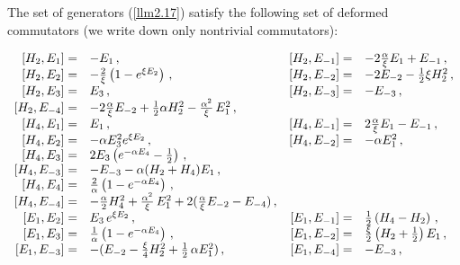 \documentclass[a4paper,12pt,showkeys]{article}
\begin{document}
 The set of generators (\ref{llm2.17}) satisfy the following set of
 deformed commutators (we write down only nontrivial commutators):

\begin{eqnarray*}
\label{lulymo1}
\begin{array}{rlrl}
    [ H_2 , E_1 ] = & - E_1 \, ,
&
[ H_2 , E_{-1} ]  =& - 2\frac{\alpha}{\xi} E_1 + E_{-1}\, ,
\cr
 [ H_2 , E_2 ] =&- \frac{2}{\xi}\left(1- e^{\xi E_2} \right) \, ,
& [ H_2 , E_{-2} ] =&  - 2E_{-2}- \frac{1}{2} \xi H_{2}^2 \, ,
\cr [ H_2 , E_3 ] =& E_3 \, ,
&[ H_2 , E_{-3} ] =& -  E_{-3} \, ,
\cr [ H_2 , E_{-4} ] =&
    - 2\frac{\alpha}{\xi} E_{-2}  + \frac{1}{2}\alpha H^2_2
    - \frac{\alpha^2}{\xi}\, E_1^2 \, , &
\cr [ H_4 , E_1 ] =& E_1 \, , & [ H_4 , E_{-1} ] = &
2\frac{\alpha}{\xi} E_1 - E_{-1} \,, \cr [ H_4 , E_2 ] =&- \alpha
E_3^2 e^{\xi E_2} \, ,
 &[ H_4 , E_{-2} ]=& -\alpha E_1^2 \, ,
\cr
 [ H_4 , E_3 ] =& 2 E_3 \left( e^{-\alpha E_4} -
    \frac{1}{2}\right)\, ,
\cr
 [ H_4 , E_{-3} ] =& - E_{-3} - \alpha (H_2 +H_4) E_1 \, ,&&
\cr
 [H_4 , E_4 ]   = & \frac{2}{\alpha}
    \left(1-  e^{-\alpha E_4} \right)\, ,&&
\cr
 [ H_4 , E_{-4} ] =& -\frac{\alpha}{2} H_4^2
    + \frac{\alpha^2}{\xi}\, E_1^2
    + 2(\frac{\alpha}{\xi}E_{-2} - E_{-4}) \, ,&&
\cr
 [ E_1 , E_2 ] =&  E_3 \, e^{\xi E_2} \, ,
\qquad
& [ E_1 , E_{-1} ] =& \frac{1}{2} \left( H_4 - H_2 \right) \, ,
\cr [ E_1 , E_3 ] =&\frac{1}{\alpha}
    \left( 1 - e^{-\alpha E_4} \right)\, ,
    \qquad
& [ E_1 , E_{-2} ] =&  \frac{\xi}{2}\left(  H_2 +\frac{1}{2} \right)E_1  \, ,
\cr [ E_1 , E_{-3} ] =& - (E_{-2} -\frac{\xi}{4} H^2_2
    + \frac{1}{2}\, \alpha  E_1^2 )\, ,
    \qquad
    &[ E_1 , E_{-4} ] =& - E_{-3} \, ,
\end{array}
\end{eqnarray*}
\end{document}
